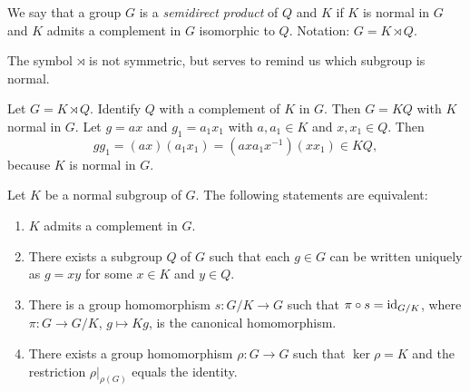 \begin{definition}
We say that a group $G$ is a \emph{semidirect product} of $Q$ and $K$ if $K$ 
is normal in $G$ and 
$K$ admits a complement in $G$ isomorphic to $Q$. Notation: $G=K\rtimes Q$.
\end{definition}

The symbol $\rtimes$ is not symmetric, but serves to remind us which subgroup is normal. 

Let $G=K\rtimes Q$. 
Identify $Q$ with a complement of $K$ in $G$. 
Then $G=KQ$ with $K$ normal in $G$. 
Let $g=ax$ and $g_1=a_1x_1$ with $a,a_1\in K$ and $x,x_1\in Q$. 
Then 
\[
gg_1=(ax)(a_1x_1)=(axa_1x^{-1})(xx_1)\in KQ,
\]
because $K$ is normal in $G$. 

\begin{theorem}
Let $K$ be a normal subgroup of $G$. The following statements are equivalent:
\begin{enumerate}
\item $K$ admits a complement in $G$.
\item There exists a subgroup $Q$ of $G$ such that each $g\in G$ can be written uniquely 
as $g=xy$ for some 
$x\in K$ and $y\in Q$.
\item There is a group homomorphism $s\colon G/K\to G$ such that $\pi\circ s=\operatorname{id}_{G/K}$, where $\pi\colon G\to G/K
$, $g\mapsto Kg$, is the canonical homomorphism.
\item There exists a group homomorphism $\rho\colon G\to G$ such that $\ker\rho=K$ and the restriction $\rho|_{\rho(G)}$ equals the identity. 
\end{enumerate}
\end{theorem}

